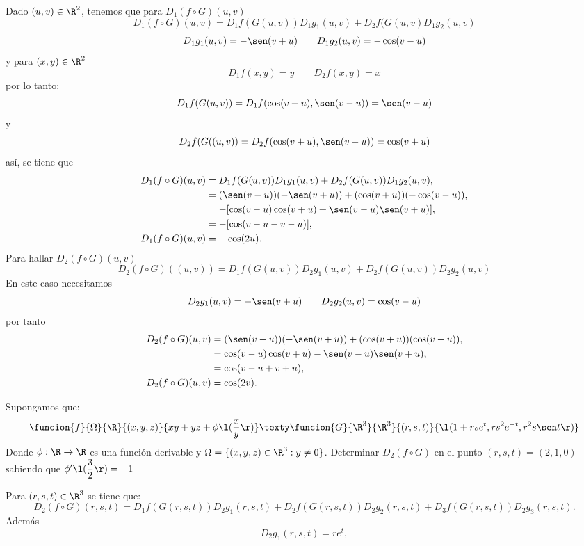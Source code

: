 \documentclass[a4,11pt]{aleph-examen}
\begin{document}
\begin{preguntas}
\begin{respuesta}
\begin{respuesta}
\begin{respuesta} 
	Dado $(u,v)\in\R^2$, tenemos que para $D_1(f\circ G)(u,v)$
	\[
	D_1(f\circ G)(u,v)=D_1f(G(u,v))D_1g_1(u,v)+D_2f(G(u,v)D_1g_2(u,v)
	        \]
		\[
	D_1g_1(u,v)=- \sen (v+u)\qquad  D_1g_2(u,v)=-\cos(v-u)
	        \]
    y para $(x,y)\in \R^2$
    	\[
	D_1f(x,y)=y\qquad D_2f(x,y)=x
	        \]
	por lo tanto:
		\[
	D_1f(G(u,v))=D_1f(\cos(v+u),\sen(v-u))=\sen(v-u)
	        \]
	y
	\[
	D_2f(G((u,v))=D_2f(\cos(v+u),\sen(v-u))=\cos(v+u)
	        \]
	así, se tiene que
    \begin{align*}
    D_1(f\circ G)(u,v)&=D_1f(G(u,v))D_1g_1(u,v)+D_2f(G(u,v))D_1g_2(u,v),\\
    &=(\sen(v-u))(-\sen(v+u))+(\cos(v+u))(-\cos(v-u)),\\
    &=-[\cos(v-u)\cos(v+u)+\sen(v-u)\sen(v+u)],\\
    &=-[\cos(v-u-v-u)],\\
    D_1(f\circ G)(u,v)&=-\cos(2u).
    \end{align*}
    Para hallar $D_2(f\circ G)(u,v)$
    \[
	D_2(f\circ G)((u,v))=D_1f(G(u,v))D_2g_1(u,v)+D_2f(G(u,v))D_2g_2(u,v)
	        \]
	En este caso necesitamos         
	\[
	D_2g_1(u,v)=-\sen(v+u)\qquad D_2g_2(u,v)=\cos(v-u)
	        \]
    por tanto
	 \begin{align*}
    D_2(f\circ G)(u,v)&=(\sen(v-u))(-\sen(v+u))+(\cos(v+u))(\cos(v-u)),\\
    &=\cos(v-u)\cos(v+u)-\sen(v-u)\sen(v+u),\\
    &=\cos(v-u+v+u),\\
    D_2(f\circ G)(u,v)&=\cos(2v).
    \end{align*}        
\end{respuesta}

\item
    Supongamos que:
	\[
        \funcion{f}{\Omega}{\R}{(x,y,z)}
        {xy+yz+\phi \l( \dfrac{x}{y}\r)} \texty \funcion{G}{\R^3}{\R^3}{(r,s,t)}
        {\l(1+rse^t,rs^2e^{-t},r^2s \sen t\r)}
    \]
    Donde $\phi: \R \rightarrow \R$ es una función derivable y $\Omega=\{(x,y,z)\in\R^3:y\neq 0\} $. Determinar $D_2(f \circ G) $ en el punto $(r,s,t)=(2,1,0)$ sabiendo que $\phi' \l(\dfrac{3}{2}\r)=-1 $

\begin{respuesta}
    Para $(r,s,t) \in \R^3$ se tiene que:
	\[
	    D_2(f \circ G)(r,s,t)=D_1f(G(r,s,t))D_2g_1(r,s,t)+D_2f(G(r,s,t))D_2g_2(r,s,t)+D_3f(G(r,s,t))D_2g_3(r,s,t).
    \]
    Además
	\[
    	D_2g_1(r,s,t)=re^t,
    \]


\end{respuesta}
\end{respuesta}
\end{respuesta}
\end{preguntas}
\end{document}
